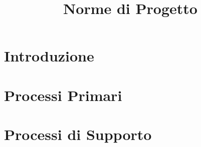 \documentclass{classes/base}
\title{Norme di Progetto}
\author{\matteo}
\begin{document}
	\maketitle
	\newpage
	\tableofcontents
	
	\newpage
	\section{Introduzione}
	
	
	\newpage
	\section{Processi Primari}
	
	
	\newpage
	\section{Processi di Supporto}
	
	
\end{document}
